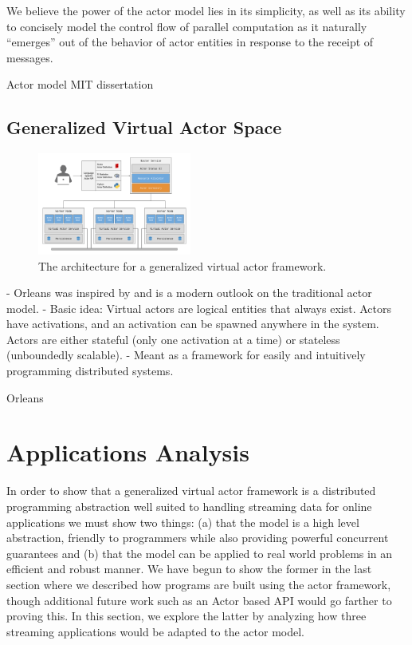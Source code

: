 \documentclass[conference,twocolumn,11pt]{IEEEtran}
\begin{document}
We believe the power of the actor model lies in its simplicity, as well as its ability to concisely model the control flow of parallel computation as it naturally ``emerges'' out of the behavior of actor entities in response to the receipt of messages.

Actor model MIT dissertation \cite{hewitt_viewing_1977, agha_actors:_1985}


\subsection{Generalized Virtual Actor Space}

\begin{figure}[h]
    \centering
    \includegraphics[width=0.45\textwidth]{architecture}
    \caption{The architecture for a generalized virtual actor framework.}
    \label{fig:architecture}
\end{figure}

- Orleans was inspired by and is a modern outlook on the traditional actor model.
- Basic idea: Virtual actors are logical entities that always exist. Actors have activations, and an activation can be spawned anywhere in the system. Actors are either stateful (only one activation at a time) or stateless (unboundedly scalable).
- Meant as a framework for easily and  intuitively programming distributed systems.

Orleans \cite{bernstein_orleans:_2014}



\section{Applications Analysis}

In order to show that a generalized virtual actor framework is a distributed programming abstraction well suited to handling streaming data for online applications we must show two things: (a) that the model is a high level abstraction, friendly to programmers while also providing powerful concurrent guarantees and (b) that the model can be applied to real world problems in an efficient and robust manner. We have begun to show the former in the last section where we described how programs are built using the actor framework, though additional future work such as an Actor based API would go farther to proving this. In this section, we explore the latter by analyzing how three streaming applications would be adapted to the actor model.
\end{document}
